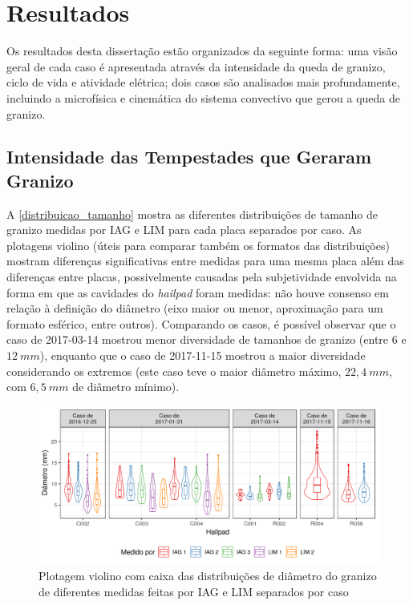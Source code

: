 \chapter{Resultados}\label{resultados}

Os resultados desta dissertação estão organizados da seguinte forma: uma visão geral de cada caso é apresentada através da intensidade da queda de granizo, ciclo de vida e atividade elétrica; dois casos são analisados mais profundamente, incluindo a microfísica e cinemática do sistema convectivo que gerou a queda de granizo.

\section{Intensidade das Tempestades que Geraram Granizo}\label{ciclo_vida}

A \autoref{distribuicao_tamanho} mostra as diferentes distribuições de tamanho de granizo medidas por IAG e LIM para cada placa separados por caso. As plotagens violino (úteis para comparar também os formatos das distribuições) mostram diferenças significativas entre medidas para uma mesma placa além das diferenças entre placas, possivelmente causadas pela subjetividade envolvida na forma em que as cavidades do \textit{hailpad} foram medidas: não houve consenso em relação à definição do diâmetro (eixo maior ou menor, aproximação para um formato esférico, entre outros). Comparando os casos, é possível observar que o caso de 2017-03-14 mostrou menor diversidade de tamanhos de granizo (entre $6$ e $12\:mm$), enquanto que o caso de 2017-11-15 mostrou a maior diversidade considerando os extremos (este caso teve o maior diâmetro máximo, $22,4\:mm$, com $6,5\:mm$ de diâmetro mínimo).

\begin{figure}[hbt]
	\begin{center}
		\caption{Plotagem violino com caixa das distribuições de diâmetro do granizo de diferentes medidas feitas por IAG e LIM separados por caso} 
		\label{distribuicao_tamanho}
		\includegraphics[width=\columnwidth]{../Hailpads_Processing/figures/measures_distribution_ptbr.png}
	\end{center}
\end{figure}

